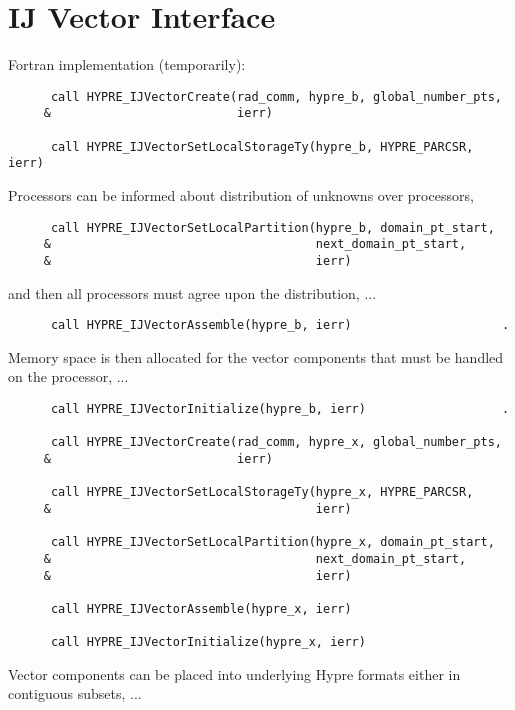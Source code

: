\section{IJ Vector Interface}

Fortran implementation (temporarily):

\begin{verbatim}
      call HYPRE_IJVectorCreate(rad_comm, hypre_b, global_number_pts,
     &                          ierr)

      call HYPRE_IJVectorSetLocalStorageTy(hypre_b, HYPRE_PARCSR, ierr)
\end{verbatim}

Processors can be informed about distribution of unknowns over processors,

\begin{verbatim}
      call HYPRE_IJVectorSetLocalPartition(hypre_b, domain_pt_start,
     &                                     next_domain_pt_start,
     &                                     ierr)
\end{verbatim}

and then all processors must agree upon the distribution, ...

\begin{verbatim}
      call HYPRE_IJVectorAssemble(hypre_b, ierr)                     .
\end{verbatim}

Memory space is then allocated for the vector components that must
be handled on the processor, ...

\begin{verbatim}
      call HYPRE_IJVectorInitialize(hypre_b, ierr)                   .

      call HYPRE_IJVectorCreate(rad_comm, hypre_x, global_number_pts,
     &                          ierr)

      call HYPRE_IJVectorSetLocalStorageTy(hypre_x, HYPRE_PARCSR,
     &                                     ierr)

      call HYPRE_IJVectorSetLocalPartition(hypre_x, domain_pt_start,
     &                                     next_domain_pt_start,
     &                                     ierr)

      call HYPRE_IJVectorAssemble(hypre_x, ierr)

      call HYPRE_IJVectorInitialize(hypre_x, ierr)
\end{verbatim}

Vector components can be placed into underlying Hypre formats either
in contiguous subsets, ...

